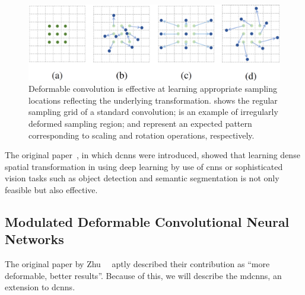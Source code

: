 \begin{figure}[t]
  \centerline{\includegraphics[width=0.7\linewidth]{figures/siamese_tracking/dcn_sampling_locations.png}}
  \caption[Various sampling locations in \glspl{dcnn}]{Deformable convolution is effective at learning appropriate sampling locations reflecting the underlying transformation.  shows the regular sampling grid of a standard convolution;  is an example of irregularly deformed sampling region;  and  represent an expected pattern corresponding to scaling and rotation operations, respectively. }
  \label{fig:SamplingLocationsDeformableCNN}
\end{figure}

The original paper~\cite{dai2017dcnn}, in which \glspl{dcnn} were introduced, showed that learning dense spatial transformation in using deep learning by use of \glspl{cnn} or sophisticated vision tasks such as object detection and semantic segmentation is not only feasible but also effective.

\subsection{Modulated Deformable Convolutional Neural Networks}
\label{ssec:ModulatedDeformableCNNs}

The original paper by Zhu~\etal{}~\cite{zhu2018mdcnn} aptly described their contribution as ``more deformable, better results''. Because of this, we will describe the \glspl{mdcnn}, an extension to \glspl{dcnn}.


